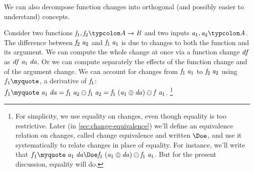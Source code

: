 We can also decompose function changes into orthogonal (and
possibly easier to understand) concepts.

Consider two functions \ensuremath{\Varid{f}_{1},\Varid{f}_{2}\typcolon\Conid{A}\to \Conid{B}} and two inputs \ensuremath{\Varid{a}_{1},\Varid{a}_{2}\typcolon\Conid{A}}.
The difference between \ensuremath{\Varid{f}_{2}\;\Varid{a}_{2}} and \ensuremath{\Varid{f}_{1}\;\Varid{a}_{1}} is due to changes to
both the function and its argument. We can compute the whole
change at once via a function change \ensuremath{\Varid{df}} as \ensuremath{\Varid{df}\;\Varid{a}_{1}\;\Varid{da}}. Or we
can compute separately the effects of the function change and of
the argument change. We can account for changes from \ensuremath{\Varid{f}_{1}\;\Varid{a}_{1}} to \ensuremath{\Varid{f}_{2}\;\Varid{a}_{2}}
using \ensuremath{f_{1}\myquote}, a derivative of \ensuremath{\Varid{f}_{1}}: \ensuremath{f_{1}\myquote\;\Varid{a}_{1}\;\Varid{da}\mathrel{=}\Varid{f}_{1}\;\Varid{a}_{2}\ominus \Varid{f}_{1}\;\Varid{a}_{2}\mathrel{=}\Varid{f}_{1}\;(\Varid{a}_{1}\oplus \Varid{da})\ominus \Varid{f}\;\Varid{a}_{1}}.%
%
\footnote{For simplicity, we use equality on changes, even though equality is
  too restrictive. Later (in \cref{sec:change-equivalence}) we'll define an
  equivalence relation on changes, called change equivalence and written
  \ensuremath{\Doe}, and use it systematically to relate changes in place of equality. For
  instance, we'll write that \ensuremath{f_{1}\myquote\;\Varid{a}_{1}\;\Varid{da}\Doe\Varid{f}_{1}\;(\Varid{a}_{1}\oplus \Varid{da})\ominus \Varid{f}_{1}\;\Varid{a}_{1}}.
  But for the present discussion, equality will do.}

